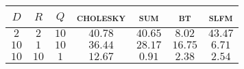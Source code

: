 
\begin{tabular}{|ccc|cccc|}
  \hline
  \abovespace\belowspace
  $D$ & $R$ & $Q$ & \textsc{cholesky} & \textsc{sum} & \textsc{bt} & \textsc{slfm}\\
\hline
  \abovespace
 $ 2 $ & $ 2 $ & $ 10 $ & $ 40.78 $ & $ 40.65 $ & $ 8.02 $ & $ 43.47 $ \\ 
 $ 10 $ & $ 1 $ & $ 10 $ & $ 36.44 $ & $ 28.17 $ & $ 16.75 $ & $ 6.71 $ \\ 
 $ 10 $ & $ 10 $ & $ 1 $ & $ 12.67 $ & $ 0.91 $ & $ 2.38 $ & $ 2.54 $ 
  \belowspace \\

  \hline
\end{tabular}
